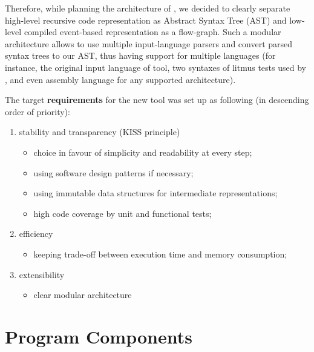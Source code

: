 Therefore, while planning the architecture of \porthos[2], we decided to clearly separate high-level recursive code representation as Abstract Syntax Tree (AST) and low-level compiled event-based representation as a flow-graph. Such a modular architecture allows to use multiple input-language parsers and convert parsed syntax trees to our AST, thus having support for multiple languages (for instance, the original input language of \porthos tool, two syntaxes of litmus tests used by , and even assembly language for any supported architecture).

The target \textbf{requirements} for the new tool was set up as following (in descending order of priority):

\begin{enumerate}[nolistsep]
        \item stability and transparency (KISS principle)
                \begin{itemize}
                        \item choice in favour of simplicity and readability at every step;
                        \item using software design patterns if necessary;
                        \item using immutable data structures for intermediate representations;
                        \item high code coverage by unit and functional tests;
                \end{itemize}                
        \item efficiency
                \begin{itemize}
                        \item keeping trade-off between execution time and memory consumption;
                \end{itemize}
        \item extensibility
                \begin{itemize}
                        \item clear modular architecture
                \end{itemize}
\end{enumerate}

\section{Program Components}
\label{ch:impl:comp}

